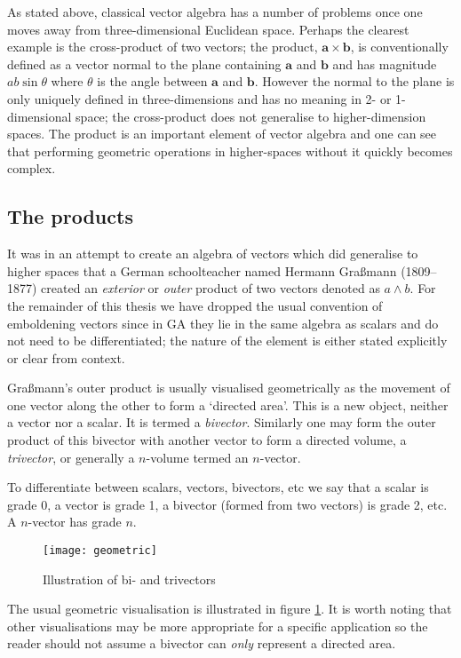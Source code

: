 As stated above, classical vector algebra has a number of problems once one
moves away from three-dimensional Euclidean space. Perhaps the clearest
example is the cross-product of two vectors; the product, $\mathbf{a} \times
\mathbf{b}$, is conventionally defined as a vector normal to the plane
containing $\mathbf{a}$ and $\mathbf{b}$ and has magnitude $ab\sin\theta$
where $\theta$ is the angle between $\mathbf{a}$ and $\mathbf{b}$. However the
normal to the plane is only uniquely defined in three-dimensions and has no
meaning in 2- or 1-dimensional space; the cross-product does not generalise to
higher-dimension spaces. The product is an important element of vector algebra
and one can see that performing geometric operations in higher-spaces without
it quickly becomes complex.

\subsection{The products}

It was in an attempt\cite{GA:grassmann} to create an algebra of vectors which
did generalise to higher spaces that a German schoolteacher named Hermann
Gra{\ss}mann (1809--1877) created an \emph{exterior} or \emph{outer} product
of two vectors denoted as $a \wedge b$. For the remainder of this thesis we
have dropped the usual convention of emboldening vectors since in GA they lie
in the same algebra as scalars and do not need to be differentiated; the
nature of the element is either stated explicitly or clear from context.

Gra{\ss}mann's outer product is usually visualised geometrically as the
movement of one vector along the other to form a `directed area'. This is a
new object, neither a vector nor a scalar. It is termed a \emph{bivector}.
Similarly one may form the outer product of this bivector with another vector
to form a directed volume, a \emph{trivector}, or generally a $n$-volume
termed an $n$-vector. 

To differentiate between scalars, vectors, bivectors, etc we say that a scalar
is grade 0, a vector is grade 1, a bivector (formed from two vectors) is grade
2, etc. A $n$-vector has grade $n$.

\begin{figure}
\centering
\texttt{[image: geometric]}
\caption{Illustration of bi- and trivectors\label{fig:geometric}}
\end{figure}

The usual geometric visualisation is illustrated in figure \ref{fig:geometric}.
It is worth noting that other visualisations may be more appropriate for a specific
application so the reader should not assume a bivector can \emph{only} represent a
directed area. 

